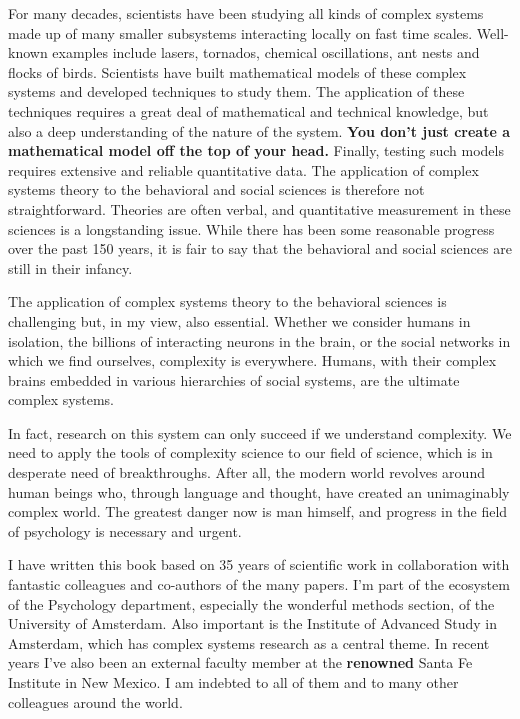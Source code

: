 \documentclass[
  letterpaper,
]{scrbook}
\begin{document}
For many decades, scientists have been studying all kinds of complex
systems made up of many smaller subsystems interacting locally on fast
time scales. Well-known examples include lasers, tornados, chemical
oscillations, ant nests and flocks of birds. Scientists have built
mathematical models of these complex systems and developed techniques to
study them. The application of these techniques requires a great deal of
mathematical and technical knowledge, but also a deep understanding of
the nature of the system. \textbf{You don't just create a mathematical
model off the top of your head.} Finally, testing such models requires
extensive and reliable quantitative data. The application of complex
systems theory to the behavioral and social sciences is therefore not
straightforward. Theories are often verbal, and quantitative measurement
in these sciences is a longstanding issue. While there has been some
reasonable progress over the past 150 years, it is fair to say that the
behavioral and social sciences are still in their infancy.

The application of complex systems theory to the behavioral sciences is
challenging but, in my view, also essential. Whether we consider humans
in isolation, the billions of interacting neurons in the brain, or the
social networks in which we find ourselves, complexity is everywhere.
Humans, with their complex brains embedded in various hierarchies of
social systems, are the ultimate complex systems.

In fact, research on this system can only succeed if we understand
complexity. We need to apply the tools of complexity science to our
field of science, which is in desperate need of breakthroughs. After
all, the modern world revolves around human beings who, through language
and thought, have created an unimaginably complex world. The greatest
danger now is man himself, and progress in the field of psychology is
necessary and urgent.

I have written this book based on 35 years of scientific work in
collaboration with fantastic colleagues and co-authors of the many
papers. I'm part of the ecosystem of the Psychology department,
especially the wonderful methods section, of the University of
Amsterdam. Also important is the Institute of Advanced Study in
Amsterdam, which has complex systems research as a central theme. In
recent years I've also been an external faculty member at the
\textbf{renowned} Santa Fe Institute in New Mexico. I am indebted to all
of them and to many other colleagues around the world.
\end{document}
